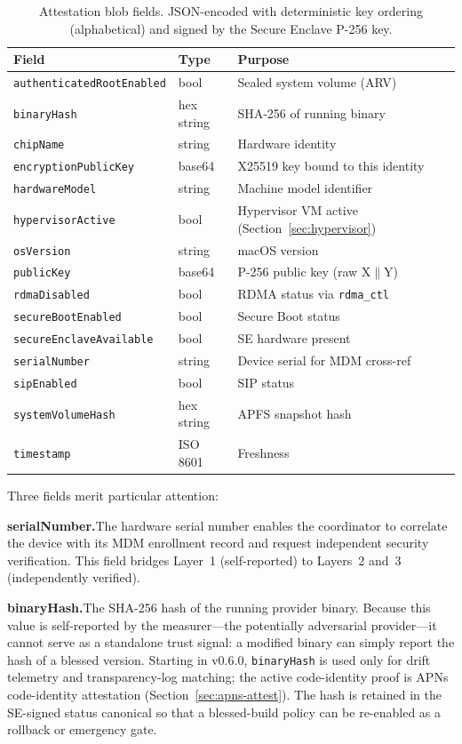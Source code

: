 \documentclass[10pt,twocolumn,letterpaper]{article}
\begin{document}
\begin{table}[h]
\centering
\caption{Attestation blob fields. JSON-encoded with deterministic key ordering (alphabetical) and signed by the Secure Enclave P-256 key.}
\vspace{4pt}
\scriptsize
\begin{tabular}{@{}llp{3.0cm}@{}}
\toprule
\textbf{Field} & \textbf{Type} & \textbf{Purpose} \\
\midrule
\texttt{authenticatedRootEnabled} & bool & Sealed system volume (ARV) \\
\texttt{binaryHash} & hex string & SHA-256 of running binary \\
\texttt{chipName} & string & Hardware identity \\
\texttt{encryptionPublicKey} & base64 & X25519 key bound to this identity \\
\texttt{hardwareModel} & string & Machine model identifier \\
\texttt{hypervisorActive} & bool & Hypervisor VM active (Section~\ref{sec:hypervisor}) \\
\texttt{osVersion} & string & macOS version \\
\texttt{publicKey} & base64 & P-256 public key (raw X$\|$Y) \\
\texttt{rdmaDisabled} & bool & RDMA status via \texttt{rdma\_ctl} \\
\texttt{secureBootEnabled} & bool & Secure Boot status \\
\texttt{secureEnclaveAvailable} & bool & SE hardware present \\
\texttt{serialNumber} & string & Device serial for MDM cross-ref \\
\texttt{sipEnabled} & bool & SIP status \\
\texttt{systemVolumeHash} & hex string & APFS snapshot hash \\
\texttt{timestamp} & ISO 8601 & Freshness \\
\bottomrule
\end{tabular}
\end{table}

Three fields merit particular attention:

\textbf{serialNumber.}\quad The hardware serial number enables the coordinator to correlate the device with its MDM enrollment record and request independent security verification. This field bridges Layer~1 (self-reported) to Layers~2 and~3 (independently verified).

\textbf{binaryHash.}\quad The SHA-256 hash of the running provider binary. Because this value is self-reported by the measurer---the potentially adversarial provider---it cannot serve as a standalone trust signal: a modified binary can simply report the hash of a blessed version. Starting in v0.6.0, \texttt{binaryHash} is used only for drift telemetry and transparency-log matching; the active code-identity proof is APNs code-identity attestation (Section~\ref{sec:apns-attest}). The hash is retained in the SE-signed status canonical so that a blessed-build policy can be re-enabled as a rollback or emergency gate.
\end{document}
